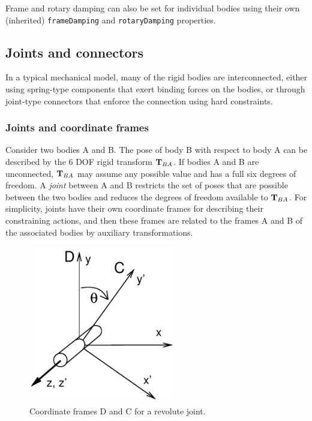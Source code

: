 Frame and rotary damping can also be set for individual bodies using
their own (inherited) {\tt frameDamping} and {\tt rotaryDamping}
properties.

\subsection{Joints and connectors}
\label{JointsAndConnectors:sec}

In a typical mechanical model, many of the rigid bodies are
interconnected, either using spring-type components that exert binding
forces on the bodies, or through joint-type connectors that enforce
the connection using hard constraints.

\subsubsection{Joints and coordinate frames}

Consider two bodies A and B. The pose of body B with respect to body A
can be described by the 6 DOF rigid transform ${\bf T}_{BA}$.  If bodies A
and B are unconnected, ${\bf T}_{BA}$ may assume any possible value
and has a full six degrees of freedom. A {\it joint} between A and B
restricts the set of poses that are possible between the two bodies
and reduces the degrees of freedom available to ${\bf T}_{BA}$.  For
simplicity, joints have their own coordinate frames for describing
their constraining actions, and then these frames are related to the
frames A and B of the associated bodies by auxiliary transformations.

\begin{figure}[ht]
\begin{center}
 \includegraphics[width=2.5in]{images/jointExample}
\end{center}
\caption{Coordinate frames D and C for a revolute joint.}
\label{jointExample:fig}
\end{figure}

